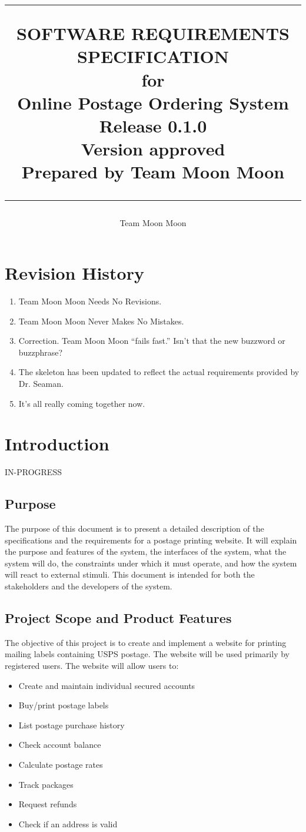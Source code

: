 \documentclass{scrreprt}
\title{%
\flushright
\rule{16cm}{5pt}\vskip1cm
\Huge{SOFTWARE REQUIREMENTS\\ SPECIFICATION}\\
\vspace{2cm}
for\\
\vspace{2cm}
Online Postage Ordering System\\
\vspace{2cm}
\LARGE{Release 0.1.0\\}
\vspace{2cm}
\LARGE{Version \myversion approved\\}
\vspace{2cm}
Prepared by Team Moon Moon\\
\vfill
\rule{16cm}{5pt}
}
\date{}
\author{Team Moon Moon}
\begin{document}
\maketitle
\tableofcontents

\chapter*{Revision History}

\begin{enumerate}
\item Team Moon Moon Needs No Revisions.
\item Team Moon Moon Never Makes No Mistakes.
\item Correction. Team Moon Moon ``fails fast.'' Isn't that the new 
buzzword or buzzphrase?
\item The skeleton has been updated to reflect the actual requirements 
provided by Dr. Seaman.
\item It's all really coming together now.
\end{enumerate}

\chapter{Introduction}

IN-PROGRESS

\section{Purpose}

The purpose of this document is to present a detailed description of the
speciﬁcations and the requirements for a postage printing website. It will
explain the purpose and features of the system, the interfaces of the system,
what the system will do, the constraints under which it must operate, and how
the system will react to external stimuli. This document is intended for both
the stakeholders and the developers of the system.

\section{Project Scope and Product Features}

The objective of this project is to create and implement a website for printing
mailing labels containing USPS postage. The website will be used primarily by
registered users. The website will allow users to: 

\begin{itemize}
\item Create and maintain individual secured accounts
\item Buy/print postage labels
\item List postage purchase history
\item Check account balance
\item Calculate postage rates
\item Track packages
\item Request refunds
\item Check if an address is valid
\end{itemize}
\end{document}
